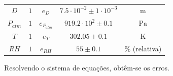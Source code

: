 \begin{table}[ht]
{\begin{tabular}{ccc|c|c}
$D$    & $1$                                                                                                                         & $e_{D}$                                    & $7.5\cdot 10^{-2} \pm 1 \cdot 10^{-3}$ & $\mathrm{m}$ \\
$P_{atm}$ & $1$                                                                                                                         & $e_{P_{atm}}$                             & $919.2\cdot 10^{2} \pm 0.1$ & $\mathrm{Pa}$ \\
$T$    & $1$                                                                                                                         & $e_{T}$                                    & $302.05 \pm 0.1$ & $\mathrm{K}$ \\
$RH$   & $1$                                                                                                                         & $e_{RH}$                                   & $55 \pm 0.1$ & $\%$ (relativa) \\ \bottomrule                    
\end{tabular}
}
\end{table}



Resolvendo o sistema de equações, obtêm-se os erros.














